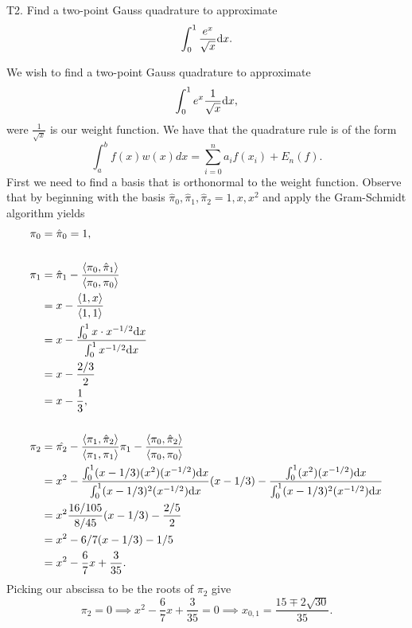\documentclass[12pt]{report}
\begin{document}


\begin{problem}
    T2. Find a two-point Gauss quadrature to approximate 
    \[ 
        \int_0^1 \frac{e^x}{\sqrt{x}}\mathrm{d}x. 
    \]
\end{problem}

\begin{solution}
    
    \noindent
    We wish to find a two-point Gauss quadrature to approximate
    \[ 
        \int_0^1 e^x \frac{1}{\sqrt{x}}\mathrm{d}x,       
        \]
        were $\frac{1}{\sqrt{x}}$ is our weight function. 
        We have that the quadrature rule is of the form
        \[ 
            \int_a^b f(x)w(x)dx = \sum_{i=0}^{n}a_if(x_i) + E_n(f).
        \]
        First we need to find a basis that is orthonormal to the weight function. Observe that by beginning with the basis $\hat{\pi}_0,\hat{\pi}_1,\hat{\pi}_2=1,x,x^2$ and apply the Gram-Schmidt algorithm yields
    \begin{align*}
        \pi_0 &= \hat{\pi}_0 = 1,\\
        \\
        \pi_1 &= \hat{\pi}_1 - \frac{{\left\langle\pi_0,\hat{\pi}_1\right\rangle}}{{\left\langle\pi_0,\pi_0\right\rangle}}\\
        &=x - \frac{{\left\langle1,x\right\rangle}}{{\left\langle1,1\right\rangle}}\\
        &= x - \frac{\int_0^1 x \cdot x^{-1/2}\mathrm{d}x}{\int_0^1x^{-1/2}\mathrm{d}x}\\
        &= x - \frac{2/3}{2}\\
        &= x - \frac{1}{3},\\
        \\
        \pi_2 &= \hat{\pi_2} - \frac{{\left\langle\pi_1,\hat{\pi}_2\right\rangle}}{{\left\langle\pi_1,\pi_1\right\rangle}}\pi_1 - \frac{{\left\langle\pi_0,\hat{\pi}_2\right\rangle}}{{\left\langle\pi_0,\pi_0\right\rangle}}\\
        &= x^2 - \frac{\int_0^1 (x - 1/3)(x^2)(x^{-1/2})\mathrm{d}x}{\int_0^1(x - 1/3)^2(x^{-1/2})\mathrm{d}x}(x - 1/3) - \frac{\int_0^1 (x^2)(x^{-1/2})\mathrm{d}x}{\int_0^1(x - 1/3)^2(x^{-1/2})\mathrm{d}x}\\
        &=x^2 \frac{16/105}{8/45}(x-1/3) - \frac{2/5}{2}\\
        &=x^2 - 6/7(x-1/3) - 1/5\\
        &= x^2 - \frac{6}{7}x + \frac{3}{35}.
    \end{align*}
    Picking our abscissa to be the roots of $\pi_2$ give
    \[ 
        \pi_2 = 0 \implies  x^2 - \frac{6}{7}x + \frac{3}{35} = 0 \implies x_{0,1} = \frac{15\mp 2\sqrt{30}}{35}.
\]
\end{solution}
\end{document}
